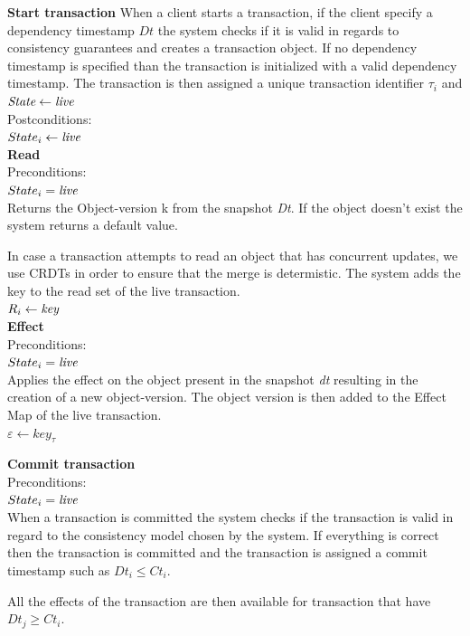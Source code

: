 \documentclass[parallelisme]{compas2022}
\begin{document}
\textbf{Start transaction}
When a client starts a transaction, if the client specify a dependency timestamp $Dt$ the system checks if it is valid in regards to consistency guarantees and creates a transaction object.
If no dependency timestamp is specified than the transaction is initialized with a valid dependency timestamp.
The transaction is then assigned a unique transaction identifier $\tau_i$ and $\emph{State} \leftarrow \emph{live}$ \\

Postconditions:\\
$State_i \leftarrow \emph{live}$ \\


\textbf{Read}\\
Preconditions:\\ 
$State_i = \emph{live}$ \\

Returns the Object-version k from the snapshot \emph{Dt}. 
If the object doesn't exist the system returns a default value.

In case a transaction attempts to read an object that has concurrent updates, we use CRDTs in order to ensure that the merge is determistic.
The system adds the key to the read set of the live transaction.\\
$R_i \leftarrow \emph{key}$\\

\textbf{Effect}\\
Preconditions:\\ 
$State_i = \emph{live}$ \\

Applies the effect on the object present in the snapshot \emph{dt} resulting in the creation of a new object-version.
The object version is then added to the Effect Map of the live transaction.\\
$\varepsilon \leftarrow key_{\tau}$

\textbf{Commit transaction}\\
Preconditions:\\ 
$State_i = \emph{live}$ \\

When a transaction is committed the system checks if the transaction is valid in regard to the consistency model chosen by the system.
If everything is correct then the transaction is committed and the transaction is assigned a commit timestamp such as $Dt_i \leq Ct_i$.

All the effects of the transaction are then available for transaction that have $Dt_j \geq Ct_i$.\\
\end{document}
